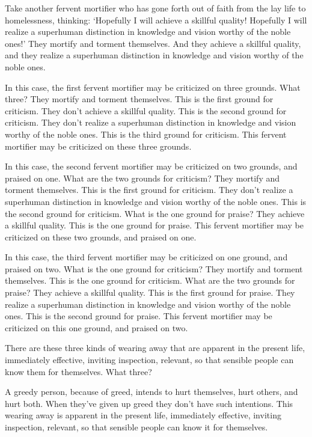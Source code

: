 \documentclass[12pt,openany]{book}%
\begin{document}
Take another fervent mortifier who has gone forth out of faith from the lay life to homelessness, thinking: ‘Hopefully I will achieve a skillful quality! Hopefully I will realize a superhuman distinction in knowledge and vision worthy of the noble ones!’ They mortify and torment themselves. And they achieve a skillful quality, and they realize a superhuman distinction in knowledge and vision worthy of the noble ones. 

In this case, the first fervent mortifier may be criticized on three grounds. What three? They mortify and torment themselves. This is the first ground for criticism. They don’t achieve a skillful quality. This is the second ground for criticism. They don’t realize a superhuman distinction in knowledge and vision worthy of the noble ones. This is the third ground for criticism. This fervent mortifier may be criticized on these three grounds. 

In this case, the second fervent mortifier may be criticized on two grounds, and praised on one. What are the two grounds for criticism? They mortify and torment themselves. This is the first ground for criticism. They don’t realize a superhuman distinction in knowledge and vision worthy of the noble ones. This is the second ground for criticism. What is the one ground for praise? They achieve a skillful quality. This is the one ground for praise. This fervent mortifier may be criticized on these two grounds, and praised on one. 

In this case, the third fervent mortifier may be criticized on one ground, and praised on two. What is the one ground for criticism? They mortify and torment themselves. This is the one ground for criticism. What are the two grounds for praise? They achieve a skillful quality. This is the first ground for praise. They realize a superhuman distinction in knowledge and vision worthy of the noble ones. This is the second ground for praise. This fervent mortifier may be criticized on this one ground, and praised on two. 

There are these three kinds of wearing away that are apparent in the present life, immediately effective, inviting inspection, relevant, so that sensible people can know them for themselves. What three? 

A greedy person, because of greed, intends to hurt themselves, hurt others, and hurt both. When they’ve given up greed they don’t have such intentions. This wearing away is apparent in the present life, immediately effective, inviting inspection, relevant, so that sensible people can know it for themselves. 
\end{document}
